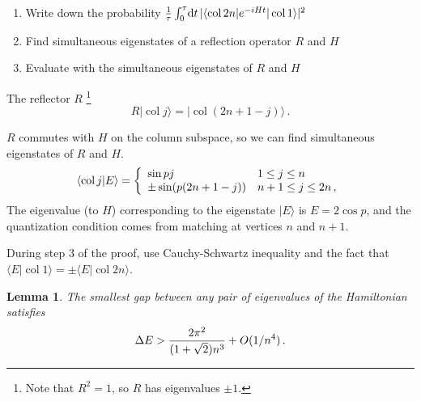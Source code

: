 \documentclass[aps,11pt,twoside,nofootinbib,tightenlines,superscriptaddress,preprintnumbers]{revtex4}
\makeatletter
\newcommand{\<}{\langle}
\renewcommand{\>}{\rangle}
\newcommand{\be}{\begin{equation}}
\newcommand{\ee}{\end{equation}}
\newcommand{\cond}[1]{\left\{\begin{array}{l@{~~~}l}#1\end{array}\right.}
\renewcommand{\d}{{\mathrm{d}}}
\newcommand{\col}{\mathop{\mathrm{col}}\nolimits}
\newtheorem{lemma}[theorem]{Lemma}
\newenvironment{proof sketch}
{\trivlist\item\noindent{\bf Proof sketch}~}
{\qed\endtrivlist}
\makeatother
\begin{document}
\begin{proof sketch}

\begin{enumerate}
    \item Write down the probability ${1 \over \tau} \int_0^\tau \! \d t \,
     |\<\col 2n|e^{-i H t}|\col 1\>|^2 \nonumber$
    \item Find simultaneous eigenstates of a reflection operator $R$ and $H$
    \item Evaluate with the simultaneous eigenstates of $R$ and $H$
\end{enumerate}


The reflector $R$ \footnote{Note that $R^2=1$, so $R$ has eigenvalues $\pm 1$.}
\be
  R|\col j\> = |\col(2n+1-j)\>
\,.
\ee

$R$ commutes with $H$ on the column subspace, so we can find simultaneous eigenstates of $R$ and
$H$.
\be
  \<\col j|E\> = \cond{
    \sin p j          & 1 \le j \le n \\
    \pm\sin(p(2n+1-j)) & n+1 \le j \le 2n \,, }
\ee
\label{eq:eigenstates}
The eigenvalue (to $H$) corresponding to the eigenstate $|E\>$ is $E=2 \cos p$, and the
quantization condition comes from matching at vertices $n$ and $n+1$.

During step 3 of the proof, use Cauchy-Schwartz inequality and the fact that $\<E|\col 1\>=\pm\<E|\col
2n\>$.

\end{proof sketch}


\begin{lemma}\label{lemma:gap}
The smallest gap between any pair of eigenvalues of the Hamiltonian
satisfies
\be
  \Delta E > {2 \pi^2 \over (1+\sqrt2)n^3} + O(1/n^4)
\,.
\ee
\end{lemma}
\end{document}
